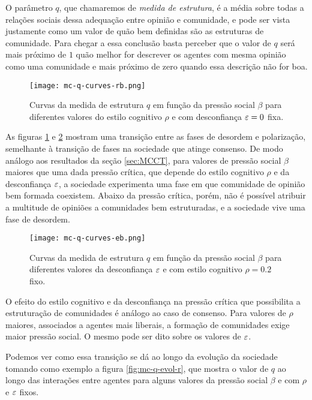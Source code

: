 O parâmetro $q$, que chamaremos de \emph{medida de estrutura}, é a média sobre todas a relações sociais dessa adequação entre opinião e comunidade, e pode ser vista justamente como um valor de quão bem definidas são as estruturas de comunidade.
Para chegar a essa conclusão basta perceber que o valor de $q$ será mais próximo de $1$ quão melhor for descrever os agentes com mesma opinião como uma comunidade e mais próximo de zero quando essa descrição não for boa.

\begin{figure}[h!]\label{fig:mc-q-curves-rb}
    \centering
    \texttt{[image: mc-q-curves-rb.png]}
    \caption{Curvas da medida de estrutura $q$ em função da pressão social $\beta$ para diferentes valores do estilo cognitivo $\rho$ e com desconfiança $\varepsilon=0$ fixa.}
\end{figure}

As figuras \ref{fig:mc-q-curves-rb} e \ref{fig:mc-q-curves-eb} mostram uma transição entre as fases de desordem e polarização, semelhante à transição de fases na sociedade que atinge consenso.
De modo análogo aos resultados da seção \ref{sec:MCCT}, para valores de pressão social $\beta$ maiores que uma dada pressão crítica, que depende do estilo cognitivo $\rho$ e da desconfiança $\varepsilon$, a sociedade experimenta uma fase em que comunidade de opinião bem formada coexistem.
Abaixo da pressão crítica, porém, não é possível atribuir a multitude de opiniões a comunidades bem estruturadas, e a sociedade vive uma fase de desordem.

\begin{figure}[h!]\label{fig:mc-q-curves-eb}
    \centering
    \texttt{[image: mc-q-curves-eb.png]}
    \caption{Curvas da medida de estrutura $q$ em função da pressão social $\beta$ para diferentes valores da desconfiança $\varepsilon$ e com estilo cognitivo $\rho=0.2$ fixo.}
\end{figure}

O efeito do estilo cognitivo e da desconfiança na pressão crítica que possibilita a estruturação de comunidades é análogo ao caso de consenso.
Para valores de $\rho$ maiores, associados a agentes mais liberais, a formação de comunidades exige maior pressão social.
O mesmo pode ser dito sobre os valores de $\varepsilon$.

Podemos ver como essa transição se dá ao longo da evolução da sociedade  tomando como exemplo a figura \ref{fig:mc-q-evol-r}, que mostra o valor de $q$ ao longo das interações entre agentes para alguns valores da pressão social $\beta$ e com $\rho$ e $\varepsilon$ fixos.

